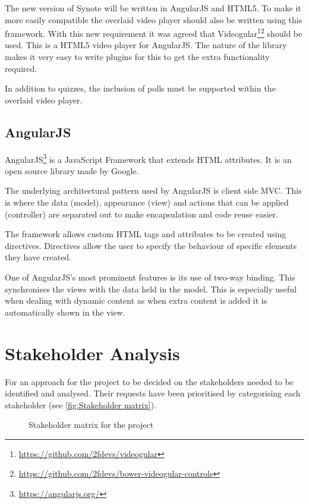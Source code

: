 The new version of Synote will be written in AngularJS and HTML5. To make it more easily compatible the overlaid video player should also be written using this framework. With this new requirement it was agreed that \gls{Videogular}\footnote{\url{https://github.com/2fdevs/videogular}}\footnote{\url{https://github.com/2fdevs/bower-videogular-controls}} should be used. This is a HTML5 video player for \gls{AngularJS}. The nature of the library makes it very easy to write plugins for this to get the extra functionality required.

In addition to quizzes, the inclusion of polls must be supported within the overlaid video player.

\subsection{AngularJS}
\label{Section:AngularJS}
\gls{AngularJS}\footnote{\url{https://angularjs.org/}} is a JavaScript Framework that extends HTML attributes. It is an open source library made by Google.

The underlying architectural pattern used by \gls{AngularJS} is client side \gls{MVC}. This is where the data (model), appearance (view) and actions that can be applied (controller) are separated out to make encapsulation and code reuse easier. 

The framework allows custom HTML tags and attributes to be created using directives. Directives allow the user to specify the behaviour of specific elements they have created.

One of \gls{AngularJS}'s most prominent features is its use of two-way binding. This synchronises the views with the data held in the model. This is especially useful when dealing with dynamic content as when extra content is added it is automatically shown in the view.

\section{Stakeholder Analysis}
For an approach for the project to be decided on the stakeholders needed to be identified and analysed. Their requests have been prioritised by categorising each stakeholder (see \autoref{fig:Stakeholder matrix}).
\begin{figure}[h!]
\centering

\caption{Stakeholder matrix for the project\label{fig:Stakeholder matrix}}
\end{figure}


